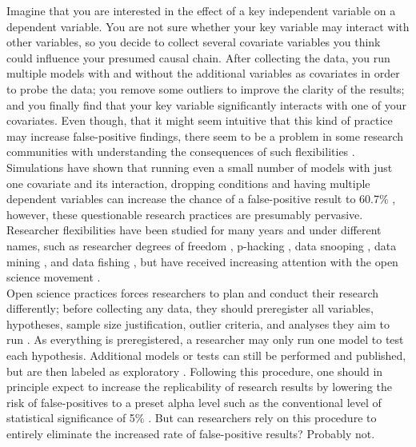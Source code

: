Imagine that you are interested in the effect of a key independent variable on a dependent variable. You are not sure whether your key variable may interact with other variables, so you decide to collect several covariate variables you think could influence your presumed causal chain. After collecting the data, you run multiple models with and without the additional variables as covariates in order to probe the data; you remove some outliers to improve the clarity of the results; and you finally find that your key variable significantly interacts with one of your covariates.
Even though, that it might seem intuitive that this kind of practice may increase false-positive findings, there seem to be a problem in some research communities with understanding the consequences of such flexibilities \citep{Makel2021,John2012,Agnoli2017,fraser2018}. 
Simulations have shown that running even a small number of models with just one covariate and its interaction, dropping conditions and having multiple dependent variables can increase the chance of a false-positive result to 60.7\% \citep{Simmons2011}, however, these questionable research practices are presumably pervasive.
Researcher flexibilities have been studied for many years and under different names, such as researcher degrees of freedom \citep{Simmons2011}, p-hacking \citep{simonsohn2014p}, data snooping \citep{white2000reality}, data mining \citep{lovell1983}, and data fishing \citep{selvin1966data}, but have received increasing attention with the open science movement \citep{banks2019answers}.   \\

Open science practices forces researchers to plan and conduct their research differently; before collecting any data, they should preregister all variables, hypotheses, sample size justification, outlier criteria, and analyses they aim to run \citep{Pham2020, Simmons2020, VANTVEER20162}. As everything is preregistered, a researcher may only run one model to test each hypothesis. Additional models or tests can still be performed and published, but are then labeled as exploratory \citep{Nosek2018}. Following this procedure, one should in principle expect to increase the replicability of research results by lowering the risk of false-positives to a preset alpha level such as the conventional level of statistical significance of 5\% \citep{Moore2016}. But can researchers rely on this procedure to entirely eliminate the increased rate of false-positive results? Probably not. \\


